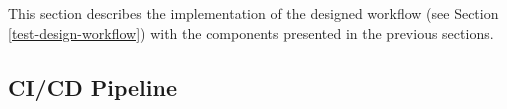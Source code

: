 

This section describes the implementation of the designed workflow (see Section \ref{test-design-workflow}) with the components presented in the previous sections.

\subsection{CI/CD Pipeline} \label{cicd}

